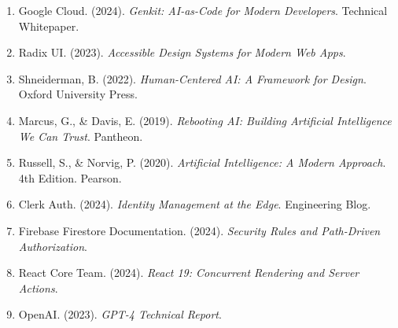 \begin{enumerate}
    \item[32] Google Cloud. (2024). \textit{Genkit: AI-as-Code for Modern Developers}. Technical Whitepaper.
    \item[33] Radix UI. (2023). \textit{Accessible Design Systems for Modern Web Apps}.
    \item[34] Shneiderman, B. (2022). \textit{Human-Centered AI: A Framework for Design}. Oxford University Press.
    \item[35] Marcus, G., \& Davis, E. (2019). \textit{Rebooting AI: Building Artificial Intelligence We Can Trust}. Pantheon.
    \item[36] Russell, S., \& Norvig, P. (2020). \textit{Artificial Intelligence: A Modern Approach}. 4th Edition. Pearson.
    \item[37] Clerk Auth. (2024). \textit{Identity Management at the Edge}. Engineering Blog.
    \item[38] Firebase Firestore Documentation. (2024). \textit{Security Rules and Path-Driven Authorization}.
    \item[39] React Core Team. (2024). \textit{React 19: Concurrent Rendering and Server Actions}.
    \item[40] OpenAI. (2023). \textit{GPT-4 Technical Report}.
\end{enumerate}

\newpage
